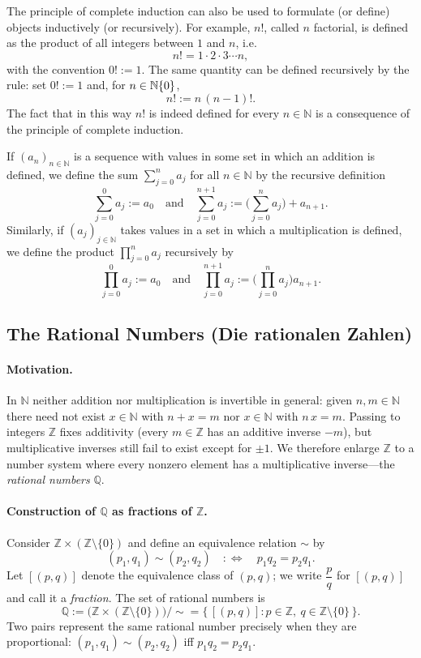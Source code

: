 \documentclass[12pt,a4paper]{article}
\newcommand{\N}{\mathbb{N}}
\newcommand{\Z}{\mathbb{Z}}
\newcommand{\Q}{\mathbb{Q}}
\theoremstyle{plain}
\theoremstyle{definition}
\theoremstyle{remark}
\begin{document}
The principle of complete induction can also be used to formulate (or define) objects inductively (or recursively). For example, $n!$, called $n$ factorial, is defined as the product of all integers between $1$ and $n$, i.e.
\[
	n! = 1\cdot 2\cdot 3\cdots n,
\]
with the convention $0!:=1$. The same quantity can be defined recursively by the rule: set $0!:=1$ and, for $n\in\N\\\{0\}$,
\[
	n! := n\,(n-1)!.
\]
The fact that in this way $n!$ is indeed defined for every $n\in\N$ is a consequence of the principle of complete induction.

If $(a_n)_{n\in\N}$ is a sequence with values in some set in which an addition is defined, we define the sum $\sum_{j=0}^{n} a_j$ for all $n\in\N$ by the recursive definition
\[
	\sum_{j=0}^{0} a_j := a_0
	\quad\text{and}\quad
	\sum_{j=0}^{n+1} a_j := \Big(\sum_{j=0}^{n} a_j\Big) + a_{n+1}.
\]
Similarly, if $(a_j)_{j\in\N}$ takes values in a set in which a multiplication is defined, we define the product $\prod_{j=0}^{n} a_j$ recursively by
\[
	\prod_{j=0}^{0} a_j := a_0
	\quad\text{and}\quad
	\prod_{j=0}^{n+1} a_j := \Big(\prod_{j=0}^{n} a_j\Big) a_{n+1}.
\]

\subsection{The Rational Numbers (Die rationalen Zahlen)}
\paragraph{Motivation.} In $\N$ neither addition nor multiplication is invertible in general: given $n,m\in\N$ there need not exist $x\in\N$ with $n+x=m$ nor $x\in\N$ with $n\,x=m$. Passing to integers $\Z$ fixes additivity (every $m\in\Z$ has an additive inverse $-m$), but multiplicative inverses still fail to exist except for $\pm1$. We therefore enlarge $\Z$ to a number system where every nonzero element has a multiplicative inverse—the \emph{rational numbers} $\Q$.

\paragraph{Construction of $\Q$ as fractions of $\Z$.} Consider $\Z\times(\Z\setminus\{0\})$ and define an equivalence relation $\sim$ by
\[
		(p_1,q_1) \sim (p_2,q_2) \quad:\iff\quad p_1 q_2 = p_2 q_1.
\]
Let $[(p,q)]$ denote the equivalence class of $(p,q)$; we write $\dfrac{p}{q}$ for $[(p,q)]$ and call it a \emph{fraction}. The set of rational numbers is
\[
		\Q := \big(\Z\times(\Z\setminus\{0\})\big)/\sim = \{\,[(p,q)] : p\in\Z,\ q\in\Z\setminus\{0\}\,\}.
\]
Two pairs represent the same rational number precisely when they are proportional: $(p_1,q_1)\sim(p_2,q_2)$ iff $p_1 q_2 = p_2 q_1$.
\end{document}
